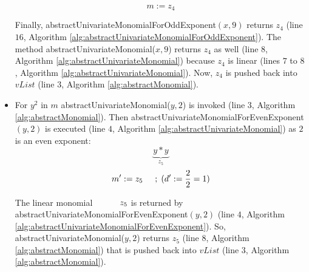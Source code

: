 \begin{sloppypar}
\begin{example}
\begin{itemize}
\tikzset{every picture/.style=remember picture}
\begin{figure}[H]
\centering
{}
\end{figure}
        
        $$m := z_{4}$$
        \begin{sloppypar}
        Finally, abstractUnivariateMonomialForOddExponent$(x, 9)$ returns $z_{4}$ (line $16$, Algorithm \ref{alg:abstractUnivariateMonomialForOddExponent}).
        The method abstractUnivariateMonomial($x, 9$) returns $z_{4}$ as well (line $8$, Algorithm \ref{alg:abstractUnivariateMonomial}) because $z_{4}$ is linear (lines $7$ to $8$, Algorithm \ref{alg:abstractUnivariateMonomial}).
        Now, $z_{4}$ is pushed back into $vList$ (line $3$, Algorithm \ref{alg:abstractMonomial}).
        \end{sloppypar}
        
\tikzset{every picture/.style=remember picture}
\begin{figure}[H]
\centering
{}
\end{figure}

        \item For $y^2$ in $m$ abstractUnivariateMonomial($y, 2$) is invoked (line $3$, Algorithm \ref{alg:abstractMonomial}).
        Then abstractUnivariateMonomialForEvenExponent$(y, 2)$ is executed (line $4$, Algorithm \ref{alg:abstractUnivariateMonomial}) as $2$ is an even exponent:
        $$\underbrace{ y \ast y }\limits_{z_{5}}$$
        $$m^\prime := z_{5} \hspace{5mm} ;\hspace{1mm}(d^\prime := \frac{2}{2} = 1)$$
        
        The linear monomial $\hspace{10mm}z_{5}$ is returned by abstractUnivariateMonomialForEvenExponent$(y, 2)$ (line $4$, Algorithm \ref{alg:abstractUnivariateMonomialForEvenExponent}).
        So, abstractUnivariateMonomial($y, 2$) returns $z_{5}$ (line $8$, Algorithm \ref{alg:abstractMonomial}) that is pushed back into $vList$ (line $3$, Algorithm \ref{alg:abstractMonomial}).
        

\end{itemize}
\end{example}
\end{sloppypar}
